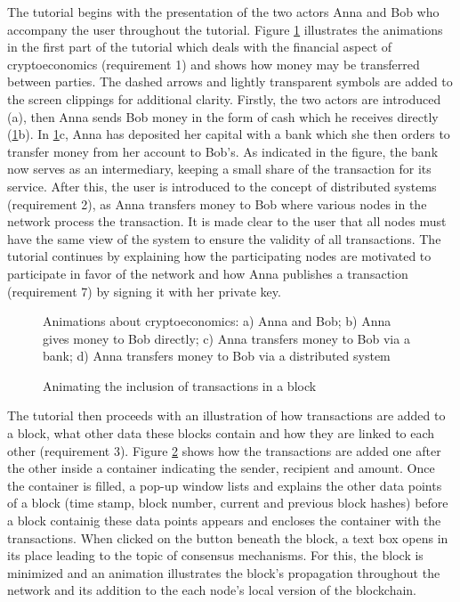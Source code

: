 The tutorial begins with the presentation of the two actors Anna and Bob who accompany the user throughout the tutorial. Figure \ref{fig:Animationline} illustrates the animations in the first part of the tutorial which deals with the financial aspect of cryptoeconomics (requirement 1) and shows how money may be transferred between parties. The dashed arrows and lightly transparent symbols are added to the screen clippings for additional clarity. Firstly, the two actors are introduced (a), then Anna sends Bob money in the form of cash which he receives directly (\ref{fig:Animationline}b). In \ref{fig:Animationline}c, Anna has deposited her capital with a bank which she then orders to transfer money from her account to Bob's. As indicated in the figure, the bank now serves as an intermediary, keeping a small share of the transaction for its service. After this, the user is introduced to the concept of distributed systems (requirement 2), as Anna transfers money to Bob where various nodes in the network process the transaction. It is made clear to the user that all nodes must have the same view of the system to ensure the validity of all transactions. The tutorial continues by explaining how the participating nodes are motivated to participate in favor of the network and how Anna publishes a transaction (requirement 7) by signing it with her private key.

\begin{figure}
    \centering
       
    \caption{Animations about cryptoeconomics: a) Anna and Bob; b) Anna gives money to Bob directly; c) Anna transfers money to Bob via a bank; d) Anna transfers money to Bob via a distributed system}
    \label{fig:Animationline}
\end{figure}


\begin{figure}
    \centering
       
    \caption{Animating the inclusion of transactions in a block}
    \label{fig:AnimationBlock}
\end{figure}

The tutorial then proceeds with an illustration of how transactions are added to a block, what other data these blocks contain and how they are linked to each other (requirement 3). Figure \ref{fig:AnimationBlock} shows how the transactions are added one after the other inside a container indicating the sender, recipient and amount. Once the container is filled, a pop-up window lists and explains the other data points of a block (time stamp, block number, current and previous block hashes) before a block containig these data points appears and encloses the container with the transactions. When clicked on the button beneath the block, a text box opens in its place leading to the topic of consensus mechanisms. For this, the block is minimized and an animation illustrates the block's propagation throughout the network and its addition to the each node's local version of the blockchain.


